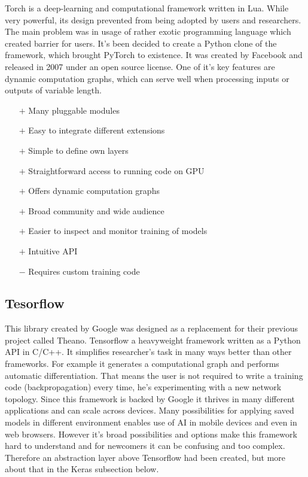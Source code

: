 Torch is a deep-learning and computational framework written in Lua. While very powerful, its design prevented from being adopted by users and researchers. The main problem was in usage of rather exotic programming language which created barrier for users. It's been decided to create a Python clone of the framework, which brought PyTorch to existence. It was created by Facebook and released in 2007 under an open source license. One of it's key features are dynamic computation graphs, which can serve well when processing inputs or outputs of variable length.

\begin{itemize}
    \item[$\boldsymbol{+}$] Many pluggable modules
    \item[$\boldsymbol{+}$] Easy to integrate different extensions
    \item[$\boldsymbol{+}$] Simple to define own layers
    \item[$\boldsymbol{+}$] Straightforward access to running code on GPU
    \item[$\boldsymbol{+}$] Offers dynamic computation graphs
    \item[$\boldsymbol{+}$] Broad community and wide audience
    \item[$\boldsymbol{+}$] Easier to inspect and monitor training of models
    \item[$\boldsymbol{+}$] Intuitive API
    \item[$\boldsymbol{-}$] Requires custom training code
\end{itemize}

\subsection{Tesorflow}

This library created by Google was designed as a replacement for their previous project called Theano. Tensorflow a heavyweight framework written as a Python API in C/C++. It simplifies researcher's task in many ways better than other frameworks. For example it generates a computational graph and performs automatic differentiation. That means the user is not required to write a training code (backpropagation) every time, he's experimenting with a new network topology. Since this framework is backed by Google it thrives in many different applications and can scale across devices. Many possibilities for applying saved models in different environment enables use of AI in mobile devices and even in web browsers. However it's broad possibilities and options make this framework hard to understand and for newcomers it can be confusing and too complex. Therefore an abstraction layer above Tensorflow had been created, but more about that in the Keras subsection below.

